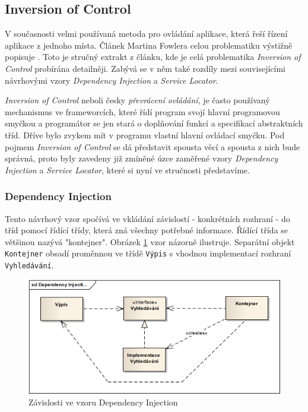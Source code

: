 \documentclass[11pt,twoside,a4paper]{book}
\begin{document}
\subsection{Inversion of Control}

V současnosti velmi používaná metoda pro ovládání aplikace, která řeší řízení aplikace z jednoho místa. Článek Martina Fowlera celou  problematiku výstižně popisuje \cite{injection}. Toto je stručný extrakt z článku, kde je celá problematika \textit{Inversion of Control} probírána detailněji. Zabývá se v něm také rozdíly mezi souvisejícími návrhovými vzory \textit{Dependency Injection} a \textit{Service Locator}.

\textit{Inversion of Control} neboli česky \textit{převrácení ovládání}, je často používaný mechanismus ve frameworcích, které řídí program svojí hlavní programovou smyčkou a programátor se jen stará o doplňování funkcí a specifikací abstraktních tříd. Dříve bylo zvykem mít v programu vlastní hlavní ovládací smyčku. Pod pojmem \textit{Inversion of Control} se dá představit spousta věcí a spousta z nich bude správná, proto byly zavedeny již zmíněné úzce zaměřené vzory \textit{Dependency Injection} a \textit{Service Locator}, které si nyní ve stručnosti představíme.

\subsubsection{Dependency Injection}
Tento návrhový vzor spočívá ve vkládání závislostí - konkrétních rozhraní - do tříd pomocí řídící třídy, která zná všechny potřebné informace. Řídící třída se většinou nazývá "kontejner". Obrázek \ref{fig:di} vzor názorně ilustruje. Separátní objekt \texttt{Kontejner} obsadí proměnnou ve třídě \texttt{Výpis} s vhodnou implementací rozhraní \texttt{Vyhledávání}.

\begin{figure}[h!]
\begin{center}
\includegraphics[scale=0.75]{figures/di}
\caption{Závislosti ve vzoru Dependency Injection}
\label{fig:di}
\end{center}
\end{figure}
\end{document}
